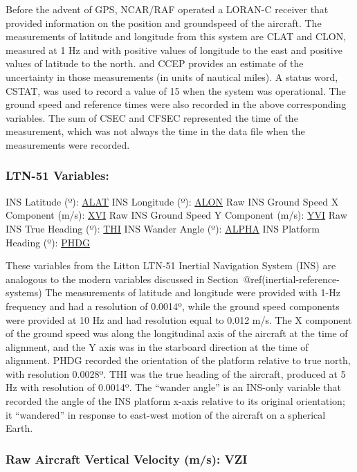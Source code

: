 \documentclass[
  english,
]{book}
\begin{document}
Before the advent of GPS, NCAR/RAF operated a LORAN-C receiver that
provided information on the position and groundspeed of the aircraft.
The measurements of latitude and longitude from this system are CLAT and
CLON, measured at 1 Hz and with positive values of longitude to the east
and positive values of latitude to the north. and CCEP provides an
estimate of the uncertainty in those measurements (in units of nautical
miles). A status word, CSTAT, was used to record a value of 15 when the
system was operational. The ground speed and reference times were also
recorded in the above corresponding variables. The sum of CSEC and CFSEC
represented the time of the measurement, which was not always the time
in the data file when the measurements were recorded.

\hypertarget{ltn51}{%
\subsubsection*{LTN-51 Variables:}\label{ltn51}}

INS Latitude ({º}): \underline{ALAT} INS Longitude ({º}):
\underline{ALON} Raw INS Ground Speed X Component (m/s): \underline{XVI}
Raw INS Ground Speed Y Component (m/s): \underline{YVI} Raw INS True
Heading ({º}): \underline{THI} INS Wander Angle ({º}): \underline{ALPHA}
INS Platform Heading ({º}): \underline{PHDG}

These variables from the Litton LTN-51 Inertial Navigation System (INS)
are analogous to the modern variables discussed in
Section~@ref(inertial-reference-systems) The measurements of latitude
and longitude were provided with 1-Hz frequency and had a resolution of
0.0014{º}, while the ground speed components were provided at 10 Hz and
had resolution equal to 0.012 m/s. The X component of the ground speed
was along the longitudinal axis of the aircraft at the time of
alignment, and the Y axis was in the starboard direction at the time of
alignment. PHDG recorded the orientation of the platform relative to
true north, with resolution 0.0028{º}. THI was the true heading of the
aircraft, produced at 5 Hz with resolution of 0.0014{º}. The ``wander
angle'' is an INS-only variable that recorded the angle of the INS
platform x-axis relative to its original orientation; it ``wandered'' in
response to east-west motion of the aircraft on a spherical Earth.

\hypertarget{vzi}{%
\subsubsection*{Raw Aircraft Vertical Velocity (m/s): VZI}\label{vzi}}
\end{document}
